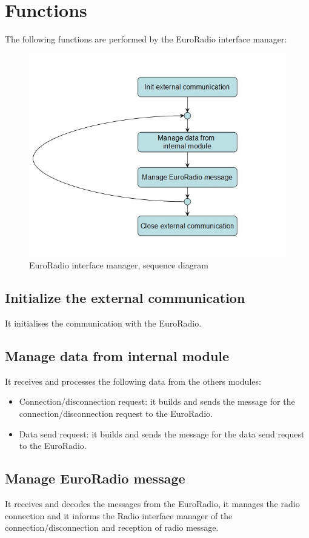 \documentclass[nocc]{template/openetcs_report}
\begin{document}
\section{Functions}
The following functions are performed by the EuroRadio interface manager:
\begin{figure}[!h]
  \centering
  \includegraphics[width=\textwidth]{image/evc_euroradio_interf_manager}
  \caption{EuroRadio interface manager, sequence diagram}
  \label{fig:EuroRadio interface manager, sequence diagram}
\end{figure}
\subsection{Initialize the external communication}
It initialises the communication with the EuroRadio.
\subsection{Manage data from internal module}
It receives and processes the following data from the others modules:
\begin{itemize}
\item Connection/disconnection request: it builds and sends the message for the connection/disconnection request to the EuroRadio.
\item Data send request: it builds and sends the message for the data send request to the EuroRadio.
\end{itemize}
\subsection{Manage EuroRadio message}
It receives and decodes the messages from the EuroRadio, it manages the radio connection and it informs the Radio interface manager of the connection/disconnection and reception of radio message.
\end{document}
